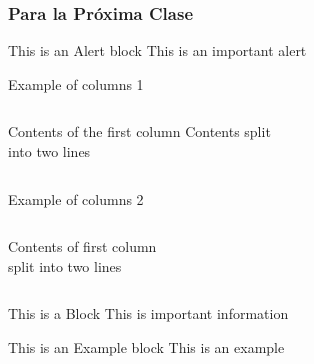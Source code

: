 \documentclass{beamer}
\begin{document}
\begin{frame}
  \frametitle{Para la Próxima Clase}

  \begin{alertblock}{This is an Alert block}
    This is an important alert
  \end{alertblock}

\end{frame}


\begin{frame}{Example of columns 1}
  \begin{columns}[c] %
    Contents of the first column
    Contents split \\ into two lines
  \end{columns}
\end{frame}

\begin{frame}{Example of columns 2}
  \begin{columns}[T] %
    \begin{column}[T]{5cm} %
      Contents of first column \\ split into two lines
    \end{column}
    \begin{column}[T]{5cm} %
      
    \end{column}
  \end{columns}
  \end{frame}

\begin{frame}

  \begin{block}{This is a Block}
    This is important information
  \end{block}

  \begin{exampleblock}{This is an Example block}
    This is an example
  \end{exampleblock}

  \end{frame}
\end{document}
